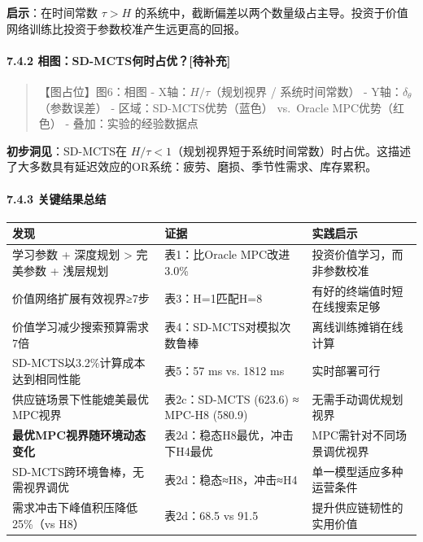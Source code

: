 \documentclass[UTF8]{ctexart}
\let\oldparagraph\paragraph
\renewcommand{\paragraph}[1]{\oldparagraph{#1}\mbox{}}
\begin{document}
\textbf{启示}：在时间常数 \(\tau > H\)
的系统中，截断偏差以两个数量级占主导。投资于价值网络训练比投资于参数校准产生远更高的回报。

\hypertarget{ux76f8ux56fesd-mctsux4f55ux65f6ux5360ux4f18ux5f85ux8865ux5145}{%
\paragraph{7.4.2
相图：SD-MCTS何时占优？{[}待补充{]}}\label{ux76f8ux56fesd-mctsux4f55ux65f6ux5360ux4f18ux5f85ux8865ux5145}}

\begin{quote}
【图占位】图6：相图 - X轴：\(H/\tau\)（规划视界 / 系统时间常数） -
Y轴：\(\delta_\theta\)（参数误差） - 区域：SD-MCTS优势（蓝色）
vs.~Oracle MPC优势（红色） - 叠加：实验的经验数据点
\end{quote}

\textbf{初步洞见}：SD-MCTS在
\(H/\tau < 1\)（规划视界短于系统时间常数）时占优。这描述了大多数具有延迟效应的OR系统：疲劳、磨损、季节性需求、库存累积。

\hypertarget{ux5173ux952eux7ed3ux679cux603bux7ed3}{%
\paragraph{7.4.3
关键结果总结}\label{ux5173ux952eux7ed3ux679cux603bux7ed3}}

\begin{table}[h]
\centering
\begin{tabular}{p{5cm}p{5cm}p{5cm}}
\toprule
\textbf{发现} & \textbf{证据} & \textbf{实践启示} \\
\midrule
学习参数 + 深度规划 > 完美参数 + 浅层规划 & 表1：比Oracle MPC改进3.0\% & 投资价值学习，而非参数校准 \\
价值网络扩展有效视界≥7步 & 表3：H=1匹配H=8 & 有好的终端值时短在线搜索足够 \\
价值学习减少搜索预算需求7倍 & 表4：SD-MCTS对模拟次数鲁棒 & 离线训练摊销在线计算 \\
SD-MCTS以3.2\%计算成本达到相同性能 & 表5：57 ms vs. 1812 ms & 实时部署可行 \\
供应链场景下性能媲美最优MPC视界 & 表2c：SD-MCTS (623.6) ≈ MPC-H8 (580.9) & 无需手动调优规划视界 \\
\textbf{最优MPC视界随环境动态变化} & 表2d：稳态H8最优，冲击下H4最优 & MPC需针对不同场景调优视界 \\
SD-MCTS跨环境鲁棒，无需视界调优 & 表2d：稳态≈H8，冲击≈H4 & 单一模型适应多种运营条件 \\
需求冲击下峰值积压降低25\%（vs H8） & 表2d：68.5 vs 91.5 & 提升供应链韧性的实用价值 \\
\bottomrule
\end{tabular}
\end{table}
\end{document}

